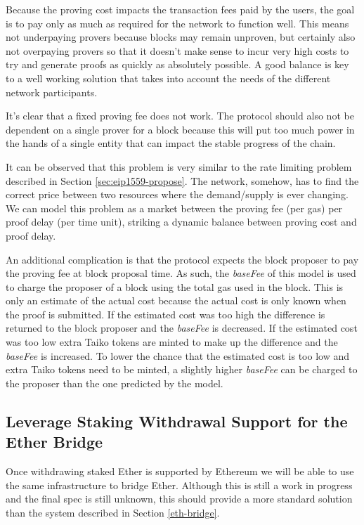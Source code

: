 \documentclass[9pt,oneside]{amsart}
\begin{document}
\begin{multicols}{2}
Because the proving cost impacts the transaction fees paid by the users, the goal is to pay only as much as required for the network to function well. This means not underpaying provers because blocks may remain unproven, but certainly also not overpaying provers so that it doesn't make sense to incur very high costs to try and generate proofs as quickly as absolutely possible. A good balance is key to a well working solution that takes into account the needs of the different network participants.

It's clear that a fixed proving fee does not work. The protocol should also not be dependent on a single prover for a block because this will put too much power in the hands of a single entity that can impact the stable progress of the chain. 

It can be observed that this problem is very similar to the rate limiting problem described in Section \ref{sec:eip1559-propose}. The network, somehow, has to find the correct price between two resources where the demand/supply is ever changing. We can model this problem as a market between the proving fee (per gas) per proof delay (per time unit), striking a dynamic balance between proving cost and proof delay.

An additional complication is that the protocol expects the block proposer to pay the proving fee at block proposal time. As such, the \emph{baseFee} of this model is used to charge the proposer of a block using the total gas used in the block. This is only an estimate of the actual cost because the actual cost is only known when the proof is submitted. If the estimated cost was too high the difference is returned to the block proposer and the \emph{baseFee} is decreased. If the estimated cost was too low extra Taiko tokens are minted to make up the difference and the \emph{baseFee} is increased. To lower the chance that the estimated cost is too low and extra Taiko tokens need to be minted, a slightly higher \emph{baseFee} can be charged to the proposer than the one predicted by the model.

\subsection{Leverage Staking Withdrawal Support for the Ether Bridge}\label{sec:withdrawals}
Once withdrawing staked Ether is supported by Ethereum we will be able to use the same infrastructure to bridge Ether. Although this is still a work in progress and the final spec is still unknown, this should provide a more standard solution than the system described in Section \ref{eth-bridge}.

\end{multicols}
\end{document}
